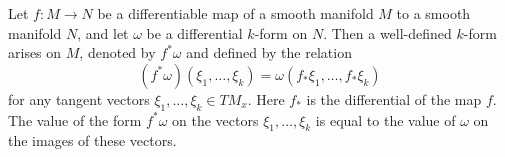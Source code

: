 Let $f: M \to N$ be a differentiable map of a smooth manifold $M$ to a smooth manifold $N$, and let $\omega$ be a differential $k$-form on $N$. Then a well-defined $k$-form arises on $M$, denoted by $f^*\omega$ and defined by the relation
$$\left(f^*\omega\right)(\xi_1, \ldots, \xi_k) = \omega\left(f_*\xi_1, \ldots, f_*\xi_k\right)$$
for any tangent vectors $\xi_1, \ldots, \xi_k \in TM_x$. Here $f_*$ is the differential of the map $f$. The value of the form $f^*\omega$ on the vectors $\xi_1, \ldots, \xi_k$ is equal to the value of $\omega$ on the images of these vectors.

